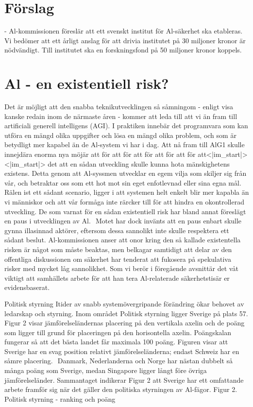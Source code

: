 {{{{{{{{{{{\section*{Förslag}
- Al-kommissionen föreslär att ett svenskt institut för Al-säkerhet ska etableras. Vi bedömer att ett årligt anslag för att drivia institutet på 30 miljoner kronor är nödvändigt. Till institutet ska en forskningsfond på 50 miljoner kronor koppels.
\section*{Al - en existentiell risk?}
Det är möjligt att den snabba teknikutvecklingen så såmningom - enligt visa kanske redain inom de närmaste åren - kommer att leda till att vi än fram till artificiali generell intelligens (AGI). I praktiken innebär det programvara som kan utföra en mängd olika uppgifter och lösa en mängd olika problem, och som är betydligt mer kapabel än de Al-system vi har i dag. Att nå fram till AlG1 skulle innejdära enorma nya möjär att för att för att för att för att för att<|im_start|><|im_start|> det att en sådan utveckling skulle kunna hota mänskighetens existens. Detta genom att Al-syssmen utvecklar en egem vilja som skiljer sig från vår, och betraktar oss som ett hot mot sin eget enfotlevnad eller sina egna mål. Rälen ist ett sådant scenario, ligger i att systemen helt enkelt blir mer kapabla än vi människor och att vår formåga inte rärcker till för att hindra en okontrollerad utveckling.
De som varnat för en sådan existentiell risk har bland annat föreslägt en paus i utvecklingen av Al. \({ }^{}\) Motet har dock invänts att en paus enbart skulle gynna illasinnad aktörer, eftersom dessa sannolikt inte skulle respektera ett sådant beslut. Al-kommissionen anser att onor kring den så kallade existentella risken är något som måste beaktas, men belkagar samtidigt att delar av den offentliga diskussionen om säkerhet har tenderat att fukosera på spekulativa risker med mycket låg sannolikhet. Som vi berör i föregående avsnittär det våt viktigt att samhällets arbete för att han tera Al-relaterade säkerhetstisär er evidensbaserat.

Politisk styrning
Itider av snabb systemövergripande förändring ökar behovet av ledarskap och styrning. Inom området Politisk styrning ligger Sverige på plats 57.
Figur 2 visar jämförelseländernas placering på den vertikala axelin och de poäng som ligger till grund för placeringen på den horisontella axelin. Poängskalan fungerar så att det bästa landet får maximala 100 poäng. Figuren visar att Sverige har en svag position relativt jämförelseländerna; endast Schweiz har en såmre placering. \({ }^{}\) Danmark, Nederlanderna och Norge har nästan dubbelt så många poäng som Sverige, medan Singapore ligger långt före övriga jämförelseländer. Sammantaget indikerar Figur 2 att Sverige har ett omfattande arbete framför sig när det gäller den politiska styrningen av Al-fägor.
Figur 2. Politisk styrning - ranking och poäng

}}}}}}}}}}}

